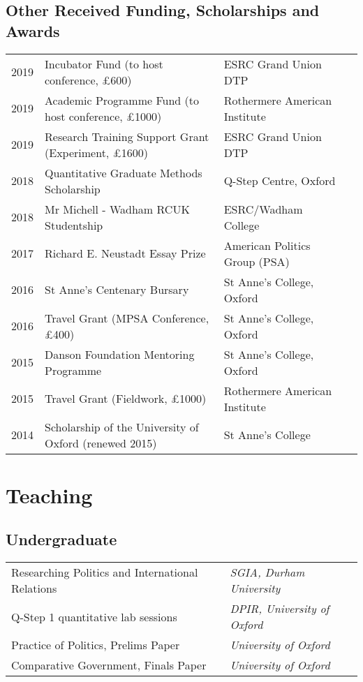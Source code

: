 \documentclass[11pt, a4paper]{article}
\begin{document}
   

\subsection*{Other Received Funding, Scholarships and Awards}
 \begin{tabular}{llll}
     2019 & Incubator Fund (to host conference, £600) & ESRC Grand Union DTP \\
     2019 & Academic Programme Fund (to host conference, £1000) & Rothermere American Institute \\
     2019 & Research Training Support Grant (Experiment, £1600) & ESRC Grand Union DTP \\
     2018 & Quantitative Graduate Methods Scholarship & Q-Step Centre, Oxford \\
     2018 & Mr Michell - Wadham RCUK Studentship & ESRC/Wadham College\\
     2017 & Richard E. Neustadt Essay Prize & American Politics Group (PSA) \\
     2016 & St Anne's Centenary Bursary & St Anne's College, Oxford \\
     2016 & Travel Grant (MPSA Conference, £400) & St Anne's College, Oxford \\
     2015 & Danson Foundation Mentoring Programme & St Anne's College, Oxford \\
     2015 & Travel Grant (Fieldwork, £1000) & Rothermere American Institute \\
     2014 & Scholarship of the University of Oxford (renewed 2015) & St Anne's College

 \end{tabular}

 \section*{Teaching}
 \subsection*{Undergraduate} 

  \begin{tabular}{p{}p{}}
      Researching Politics and International Relations & \textit{SGIA, Durham University}\\
      Q-Step 1 quantitative lab sessions & \textit{DPIR, University of Oxford} \\
      Practice of Politics, Prelims Paper & \textit{University of Oxford}\\
      Comparative Government, Finals Paper & \textit{University of Oxford} \\
  \end{tabular}
\end{document}
